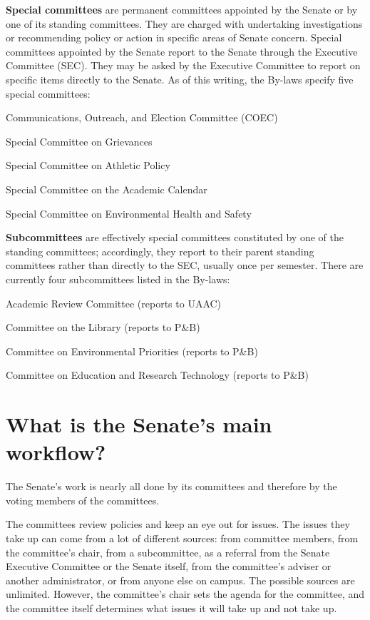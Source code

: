 \documentclass[12pt]{article}
\begin{document}
\medskip \noindent
\textbf{Special committees} are permanent committees appointed by the
Senate or by one of its standing committees. They are charged with
undertaking investigations or recommending policy or action in specific
areas of Senate concern. Special committees appointed by the Senate
report to the Senate through the Executive Committee (SEC). They may be
asked by the Executive Committee to report on specific items directly to
the Senate. As of this writing, the By-laws specify five special
committees:

\begin{cmtelist}
\item
  Communications, Outreach, and Election Committee (COEC)
\item
  Special Committee on Grievances
\item
  Special Committee on Athletic Policy
\item
  Special Committee on the Academic Calendar
\item
  Special Committee on Environmental Health and Safety
\end{cmtelist}

\medskip \noindent
\textbf{Subcommittees} are effectively special committees constituted by
one of the standing committees; accordingly, they report to their parent
standing committees rather than directly to the SEC, usually once per
semester. There are currently four subcommittees listed in the By-laws:
\begin{cmtelist}[itemsep=0pt]
\item
  Academic Review Committee (reports to UAAC)
\item
  Committee on the Library (reports to P\&B)
\item
  Committee on Environmental Priorities (reports to P\&B)
\item
  Committee on Education and Research Technology (reports to P\&B)
\end{cmtelist}

\section{What is the Senate's main
workflow?}\label{what-is-the-senates-main-workflow}

The Senate's work is nearly all done by its committees and therefore by
the voting members of the committees.

The committees review policies and keep an eye out for issues. The
issues they take up can come from a lot of different sources: from
committee members, from the committee's chair, from a subcommittee, as a
referral from the Senate Executive Committee or the Senate itself, from
the committee's adviser or another administrator, or from anyone else on
campus. The possible sources are unlimited. However, the committee's
chair sets the agenda for the committee, and the committee itself
determines what issues it will take up and not take up.
\end{document}

